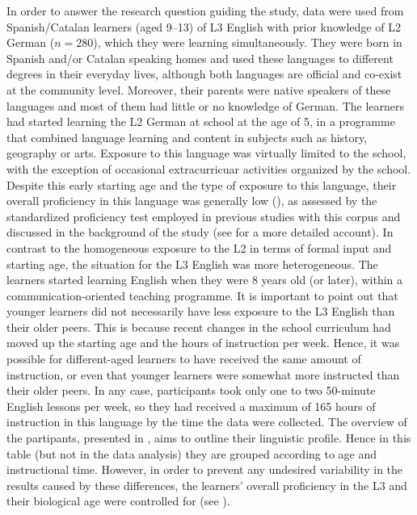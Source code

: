 \documentclass[output=paper,modfonts,nonflat, newtxmath]{langsci/langscibook}
\begin{document}
In order to answer the research question guiding the study, data were used from Spanish/Catalan learners (aged 9--13) of L3 English with prior knowledge of L2 German ($n = 280$), which they were learning simultaneously. They were born in Spanish and/or Catalan speaking homes and used these languages to different degrees in their everyday lives, although both languages are official and co-exist at the community level. Moreover, their parents were native speakers of these languages and most of them had little or no knowledge of German. The learners had started learning the L2 German at school at the age of 5, in a programme that combined language learning and content in subjects such as history, geography or arts. Exposure to this language was virtually limited to the school, with the exception of occasional extracurricuar activities organized by the school. Despite this early starting age and the type of exposure to this language, their overall proficiency in this language was generally low (\citealt{SánchezBardel2016}), as assessed by the standardized proficiency test employed in previous studies with this corpus and discussed in the background of the study (see \citealt{SánchezBardel2017} for a more detailed account). In contrast to the homogeneous exposure to the L2 in terms of formal input and starting age, the situation for the L3 English was more heterogeneous. The learners started learning English when they were 8 years old (or later), within a communication-oriented teaching programme. It is important to point out that younger learners did not necessarily have less exposure to the L3 English than their older peers. This is because recent changes in the school curriculum had moved up the starting age and the hours of instruction per week. Hence, it was possible for different-aged learners to have received the same amount of instruction, or even that younger learners were somewhat more instructed than their older peers. In any case, participants took only one to two 50-minute English lessons per week, so they had received a maximum of 165 hours of instruction in this language by the time the data were collected. The overview of the partipants, presented in , aims to outline their linguistic profile. Hence in this table (but not in the data analysis) they are grouped according to age and instructional time. However, in order to prevent any undesired variability in the results caused by these differences, the learners’ overall proficiency in the L3 and their biological age were controlled for (see ).
\end{document}
